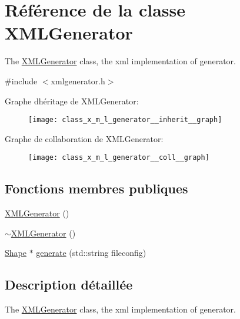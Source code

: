 \hypertarget{class_x_m_l_generator}{}\section{Référence de la classe X\+M\+L\+Generator}
\label{class_x_m_l_generator}


The \hyperlink{class_x_m_l_generator}{X\+M\+L\+Generator} class, the xml implementation of generator.  




{\ttfamily \#include $<$xmlgenerator.\+h$>$}



Graphe d\textquotesingle{}héritage de X\+M\+L\+Generator\+:
\nopagebreak
\begin{figure}[H]
\begin{center}
\leavevmode
\texttt{[image: class\_x\_m\_l\_generator\_\_inherit\_\_graph]}
\end{center}
\end{figure}


Graphe de collaboration de X\+M\+L\+Generator\+:
\nopagebreak
\begin{figure}[H]
\begin{center}
\leavevmode
\texttt{[image: class\_x\_m\_l\_generator\_\_coll\_\_graph]}
\end{center}
\end{figure}
\subsection*{Fonctions membres publiques}
\begin{DoxyCompactItemize}
\item 
\hyperlink{class_x_m_l_generator_ae88722c986a3d984f0050be10d69e6aa}{X\+M\+L\+Generator} ()
\item 
\hyperlink{class_x_m_l_generator_a8f947bac9f682ba5a22ccb98ff88ff81}{$\sim$\+X\+M\+L\+Generator} ()
\item 
\hyperlink{class_shape}{Shape} $\ast$ \hyperlink{class_x_m_l_generator_aea905ef316503fe716d368ae21f25b9b}{generate} (std\+::string fileconfig)
\end{DoxyCompactItemize}


\subsection{Description détaillée}
The \hyperlink{class_x_m_l_generator}{X\+M\+L\+Generator} class, the xml implementation of generator. 

